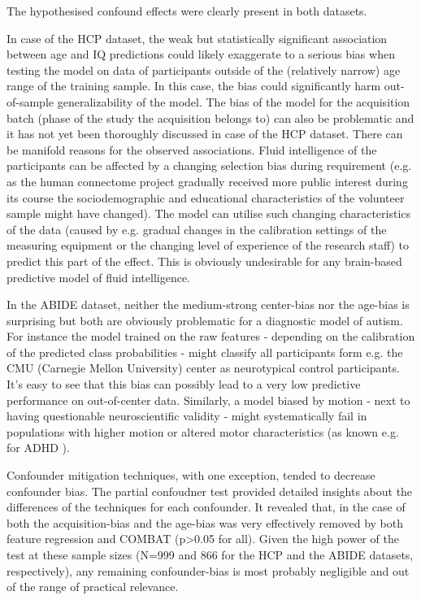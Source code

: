 \documentclass{article}
\begin{document}
The hypothesised confound effects were clearly present in both datasets.

In case of the HCP dataset, the weak but statistically significant association between age and IQ predictions could likely exaggerate to a serious bias when testing the model on data of participants outside of the (relatively narrow)
age range of the training sample. In this case, the bias could significantly harm out-of-sample generalizability of the model. The bias of the model for the acquisition batch (phase of the study the acquisition belongs to) can also be problematic and it has not yet been thoroughly discussed in case of the HCP dataset. There can be manifold reasons for the observed associations. Fluid intelligence of the participants can be affected by a changing selection bias during requirement (e.g. as the human connectome project gradually received more public interest during its course the sociodemographic and educational characteristics of the volunteer sample might have changed). The model can utilise such changing characteristics of the data (caused by e.g. gradual changes in the calibration settings of the measuring equipment or the changing level of experience of the research staff) to predict this part of the effect. This is obviously undesirable for any brain-based predictive model of fluid intelligence.

In the ABIDE dataset, neither the medium-strong center-bias nor the age-bias is surprising but both are obviously problematic for a diagnostic model of autism. For instance the model trained on the raw features - depending on the calibration of the predicted class probabilities - might classify all participants form e.g. the CMU (Carnegie Mellon University) center as neurotypical control participants. It's easy to see that this bias can possibly lead to a very low predictive performance on out-of-center data. Similarly, a model biased by motion - next to having questionable neuroscientific validity - might systematically fail in populations with higher motion or altered motor characteristics (as known e.g. for ADHD \cite{eloyan2012automated}).

Confounder mitigation techniques, with one exception, tended to decrease confounder bias. The partial confoudner test provided detailed insights about the differences of the techniques for each confounder. It revealed that, in the case of both the acquisition-bias and the age-bias was very effectively removed by both feature regression and COMBAT (p>0.05 for all). Given the high power of the test at these sample sizes (N=999 and 866 for the HCP and the ABIDE datasets, respectively), any remaining confounder-bias is most probably negligible and out of the range of practical relevance.
\end{document}
